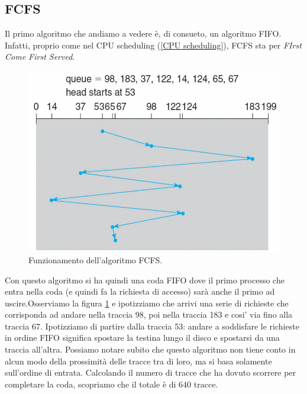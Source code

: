 \subsection{FCFS}
Il primo algoritmo che andiamo a vedere è, di consueto, un algoritmo FIFO. Infatti, proprio come nel CPU scheduling (\ref{CPU scheduling}), FCFS sta per \textit{FIrst Come First Served}.
\begin{figure}[h]
    \centering
    \includegraphics[width = .5\textwidth]{../res/imgs/mass memory/FCFS.png}
    \caption{Funzionamento dell'algoritmo FCFS.}
    \label{fig:FCFS_storage}
\end{figure}
 Con questo algoritmo si ha quindi una coda FIFO dove il primo processo che entra nella coda (e quindi fa la richiesta di accesso) sarà anche il primo ad uscire.Osserviamo la figura \ref{fig:FCFS_storage} e ipotizziamo che arrivi una serie di richieste che corrisponda ad andare nella traccia 98, poi nella traccia 183 e cosi' via fino alla traccia 67. Ipotizziamo di partire dalla traccia 53: andare a soddisfare le richieste in ordine FIFO significa spostare la testina lungo il disco e spostarsi da una traccia all'altra. Possiamo notare subito che questo algoritmo non tiene conto in alcun modo della prossimità delle tracce tra di loro, ma si basa solamente sull'ordine di entrata. Calcolando il numero di tracce che ha dovuto scorrere per completare la coda, scopriamo che il totale è di 640 tracce.

% 
